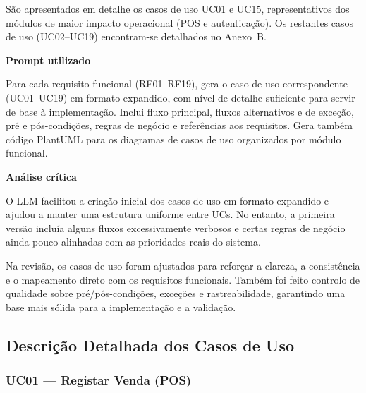     São apresentados em detalhe os casos de uso UC01 e UC15, representativos dos módulos de maior impacto operacional (POS e autenticação). Os restantes casos de uso (UC02--UC19) encontram-se detalhados no Anexo~B.

    \begin{tcolorbox}[title=Interação com o LLM]
    \textbf{Prompt utilizado}

    Para cada requisito funcional (RF01--RF19), gera o caso de uso correspondente (UC01--UC19) em formato expandido, com nível de detalhe suficiente para servir de base à implementação. Inclui fluxo principal, fluxos alternativos e de exceção, pré e pós-condições, regras de negócio e referências aos requisitos. Gera também código PlantUML para os diagramas de casos de uso organizados por módulo funcional.

    \tcblower

    \textbf{Análise crítica}

    O LLM facilitou a criação inicial dos casos de uso em formato expandido e ajudou a manter uma estrutura uniforme entre UCs. No entanto, a primeira versão incluía alguns fluxos excessivamente verbosos e certas regras de negócio ainda pouco alinhadas com as prioridades reais do sistema.

    Na revisão, os casos de uso foram ajustados para reforçar a clareza, a consistência e o mapeamento direto com os requisitos funcionais. Também foi feito controlo de qualidade sobre pré/pós-condições, exceções e rastreabilidade, garantindo uma base mais sólida para a implementação e a validação.
    \end{tcolorbox}

\subsection{Descrição Detalhada dos Casos de Uso}

\subsubsection{UC01 --- Registar Venda (POS)}

